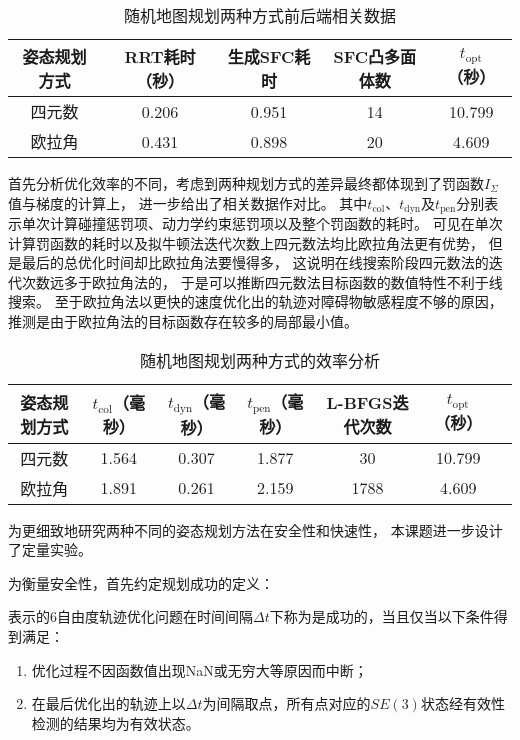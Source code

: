 \begin{table}[htbp]
    \caption{随机地图规划两种方式前后端相关数据\label{tab:data_of_2_scenarios_in_random_map}}
    \vspace{0.5em}\centering\wuhao
    \begin{tabular}{ccccc}
    \toprule[1.5pt]
    姿态规划方式 & RRT耗时（秒） & 生成SFC耗时 & SFC凸多面体数 & $t_{\text{opt}}$（秒）\\
    \midrule[0.2pt]
    四元数 & 0.206 & 0.951 & 14 & 10.799 \\
    欧拉角 & 0.431 & 0.898 & 20 & 4.609 \\
    \bottomrule[1.5pt]
    \end{tabular}
\end{table}

首先分析优化效率的不同，考虑到两种规划方式的差异最终都体现到了罚函数$I_\Sigma$值与梯度的计算上，
进一步给出了相关数据作对比。
其中$t_{\text{col}}$、$t_{\text{dyn}}$及$t_{\text{pen}}$分别表示单次计算碰撞惩罚项、动力学约束惩罚项以及整个罚函数的耗时。
可见在单次计算罚函数的耗时以及拟牛顿法迭代次数上四元数法均比欧拉角法更有优势，
但是最后的总优化时间却比欧拉角法要慢得多，
这说明在线搜索阶段四元数法的迭代次数远多于欧拉角法的，
于是可以推断四元数法目标函数的数值特性不利于线搜索。
至于欧拉角法以更快的速度优化出的轨迹对障碍物敏感程度不够的原因，
推测是由于欧拉角法的目标函数存在较多的局部最小值。

\begin{table}[htbp]
    \caption{随机地图规划两种方式的效率分析\label{tab:analysis_of_efficiency_in_random_map_scenario}}
    \vspace{0.5em}\centering\wuhao
    \begin{tabular}{ccccccc}
    \toprule[1.5pt]
    姿态规划方式 & $t_{\text{col}}$（毫秒） & $t_{\text{dyn}}$（毫秒）& $t_{\text{pen}}$（毫秒）& L-BFGS迭代次数 & $t_{\text{opt}}$（秒）\\
    \midrule[0.2pt]
    四元数 & 1.564 & 0.307 & 1.877 & 30 & 10.799 \\
    欧拉角 & 1.891 & 0.261 & 2.159 & 1788 & 4.609 \\
    \bottomrule[1.5pt]
    \end{tabular}
\end{table}

为更细致地研究两种不同的姿态规划方法在安全性和快速性，
本课题进一步设计了定量实验。

为衡量安全性，首先约定规划成功的定义：
\begin{definition}
    表示的6自由度轨迹优化问题在时间间隔$\Delta t$下称为是成功的，当且仅当以下条件得到满足：
    \begin{enumerate}
        \renewcommand{\labelenumi}{(\theenumi)}
        \item 优化过程不因函数值出现NaN或无穷大等原因而中断；
        \item 在最后优化出的轨迹上以$\Delta t$为间隔取点，所有点对应的$SE(3)$状态经有效性检测的结果均为有效状态。
    \end{enumerate}
\end{definition}

